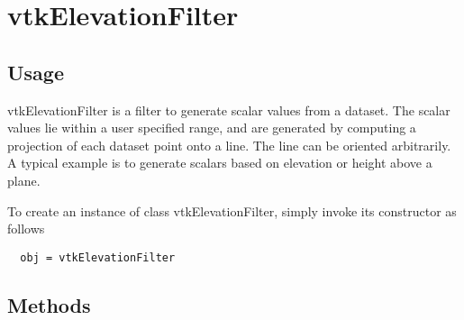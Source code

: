\section{vtkElevationFilter}

\subsection{Usage}

 vtkElevationFilter is a filter to generate scalar values from a
 dataset.  The scalar values lie within a user specified range, and
 are generated by computing a projection of each dataset point onto
 a line. The line can be oriented arbitrarily. A typical example is
 to generate scalars based on elevation or height above a plane.

To create an instance of class vtkElevationFilter, simply
invoke its constructor as follows
\begin{verbatim}
  obj = vtkElevationFilter
\end{verbatim}
\subsection{Methods}

